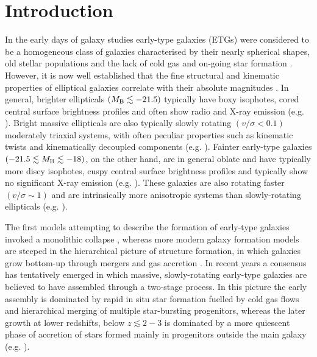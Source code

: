 \documentclass[a4paper,fleqn,usenatbib]{mnras}
\begin{document}


\section{Introduction}

In the early days of galaxy studies early-type galaxies (ETGs) were considered to be a homogeneous class of galaxies characterised by their nearly 
spherical shapes, old stellar populations and the lack of cold gas and on-going star formation 
\citep{1976ApJ...204..668F,1977ApJ...218..333K,1987ApJ...313...59D}. However, it is now well
established that the fine structural and kinematic properties of elliptical galaxies correlate with their absolute magnitudes 
\citep{1983ApJ...266...41D,1994MNRAS.269..785B,1996ApJ...464L.119K,2005ApJ...621..673T}.  
In general, brighter ellipticals $(M_{\rm B} \lesssim -21.5)$ typically have boxy isophotes, cored central surface brightness profiles and
often show radio and X-ray emission (e.g. \citealt{1997AJ....114.1771F,2009ApJS..182..216K,2016ARA&A..54..597C}). Bright massive ellipticals are also typically 
slowly rotating $(v/\sigma<0.1)$ moderately triaxial systems, with often peculiar properties such as kinematic twists and kinematically 
decoupled components (e.g. \citealt{2007MNRAS.379..418C,2011MNRAS.414..888E,2011MNRAS.414.2923K}). Fainter 
early-type galaxies $(-21.5 \lesssim M_{\rm B} \lesssim -18)$, on the other hand, are in general oblate and 
have typically more discy isophotes, cuspy central surface brightness profiles and typically show no significant X-ray emission (e.g. 
\citealt{2009ApJS..182..216K,2012ApJS..198....2K}).
These galaxies are also rotating faster $(v/\sigma\sim 1)$ and are intrinsically more anisotropic systems than slowly-rotating 
ellipticals (e.g. \citealt{2007MNRAS.379..418C,2011MNRAS.414..888E,2016ARA&A..54..597C}).

The first models attempting to describe the formation of early-type galaxies invoked a monolithic collapse \citep{1962ApJ...136..748E}, whereas
more modern galaxy formation models are steeped in the hierarchical picture of structure formation, in which galaxies grow bottom-up 
through mergers and gas accretion \citep{1978MNRAS.183..341W}. In recent years a consensus has tentatively emerged in which massive, slowly-rotating 
early-type galaxies are believed to have assembled through a two-stage process. In this picture the early assembly is dominated by rapid in situ star 
formation fuelled by cold gas flows and hierarchical merging of multiple star-bursting progenitors, whereas the later growth at lower redshifts, below
$z\lesssim 2-3$ is dominated by a more quiescent phase of accretion of stars formed mainly in progenitors outside the main galaxy (e.g. 
\citealt{2009ApJ...699L.178N,2010ApJ...725.2312O,2011ApJ...736...88F,2012ApJ...754..115J,2015MNRAS.449..361W,2017ARA&A..55...59N}).
\end{document}

